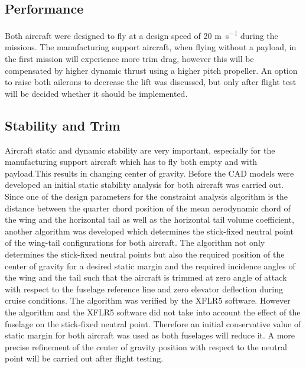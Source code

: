 \newpage
\subsection{Performance}

Both aircraft were designed to fly at a design speed of 20 \si{\meter\per\second} during the missions. The manufacturing support aircraft, when flying without a payload, in the first mission will experience more trim drag, however this will be compensated by higher dynamic thrust using a higher pitch propeller. An option to raise both ailerons to decrease the lift was discussed, but only after flight test will be decided whether it should be implemented.



\subsection{Stability and Trim}

Aircraft static and dynamic stability are very important, especially for the manufacturing support aircraft which has to fly both empty and with payload.This results in changing center of gravity. Before the CAD models were developed an initial static stability analysis for both aircraft was carried out. Since one of the design parameters for the constraint analysis algorithm is the distance between the quarter chord position of the mean aerodynamic chord of the wing and the horizontal tail as well as the horizontal tail volume coefficient, another algorithm was developed which determines the stick-fixed neutral point of the wing-tail configurations for both aircraft. The algorithm not only determines the stick-fixed neutral points but also the required position of the center of gravity for a desired static margin and the required incidence angles of the wing and the tail such that the aircraft is trimmed at zero angle of attack with respect to the fuselage reference line and zero elevator deflection during cruise conditions. The algorithm was verified by the XFLR5 software. However the algorithm and the XFLR5 software did not take into account the effect of the fuselage on the stick-fixed neutral point. Therefore an initial conservative value of static margin for both aircraft was used as both fuselages will reduce it. A more precise refinement of the center of gravity position with respect to the neutral point will be carried out after flight testing. 

